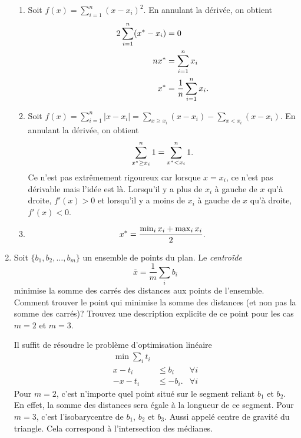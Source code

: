 \begin{enumerate}
    \begin{solution}
      \begin{enumerate}
        \item
          Soit $f(x) = \sum_{i=1}^{n}(x-x_{i})^{2}$.
          En annulant la dérivée, on obtient
          \begin{align*}
            2\sum_{i=1}^{n}(x^*-x_{i}) & = 0\\
            nx^* & = \sum_{i=1}^{n} x_{i}\\
            x^* & = \frac{1}{n}\sum_{i=1}^{n} x_{i}.
          \end{align*}
        \item
          Soit $f(x) = \sum_{i=1}^{n} |x-x_{i}| = \sum_{x \geq x_{i}}
          (x-x_{i}) - \sum_{x < x_{i}} (x-x_{i})$.
          En annulant la dérivée, on obtient
          \[ \sum_{x^* \geq x_i}^n 1 = \sum_{x^* < x_i}^n 1. \]
          Ce n'est pas extrêmement rigoureux car lorsque
          $x = x_i$, ce n'est pas dérivable mais l'idée est là.
          Lorsqu'il y a plus de $x_i$ à gauche de $x$ qu'à droite,
          $f'(x) > 0$ et
          lorsqu'il y a moins de $x_i$ à gauche de $x$ qu'à droite,
          $f'(x) < 0$.
        \item
          \[ x^* = \frac{\min_i x_i + \max_i x_i}{2}. \]
      \end{enumerate}
    \end{solution}



  \item  Soit $\{b_1, b_2, \ldots, b_m\}$ un ensemble de points du plan. Le \emph{centro\"ide}
    $$\overline x = \frac{1}{m} \sum_i b_i$$
    minimise la somme des carrés des distances aux points de l'ensemble. Comment trouver le point qui minimise la somme des distances (et
    non pas la somme des carrés)? Trouvez une description explicite de ce point pour les cas $m=2$ et $m=3$.

    \begin{solution}
      Il suffit de résoudre le problème d'optimisation linéaire
      \begin{align*}
        \min \sum_i t_i\\
        x - t_i & \leq b_i & \forall i \\
        -x - t_i & \leq -b_i. & \forall i
      \end{align*}
      Pour $m = 2$, c'est n'importe quel point situé sur le segment reliant $b_1$ et $b_2$. En effet, la somme des distances sera égale à la longueur de ce segment.
      Pour $m = 3$, c'est l'isobarycentre de $b_1$, $b_2$ et $b_3$.
      Aussi appelé centre de gravité du triangle. Cela correspond à l'intersection des médianes.
    \end{solution}





\end{enumerate}
